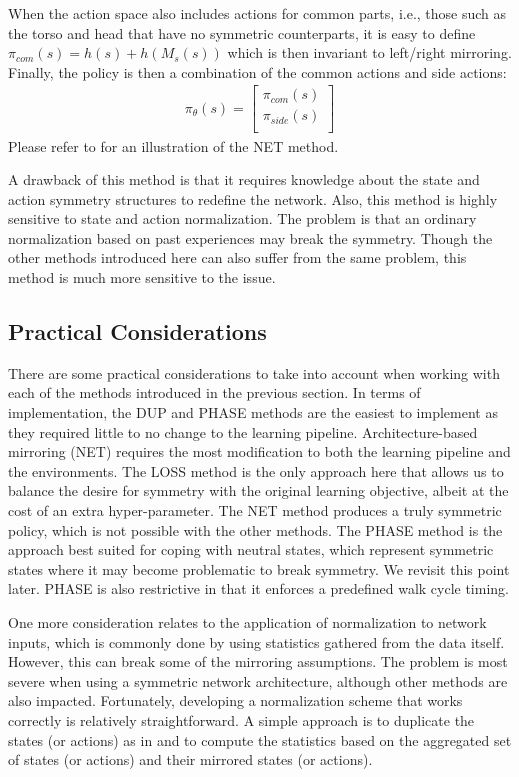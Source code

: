 When the action space also includes actions for common parts,
i.e., those such as the torso and head that have no symmetric counterparts,
it is easy to define $\pi_{com}(s) = h(s) + h(M_s(s))$ 
which is then invariant to left/right mirroring. 
Finally, the policy is then a combination of the common actions and side actions:
\begin{align*}
    \pi_\theta(s) = \begin{bmatrix}
        \pi_{com}(s)\\
        \pi_{side}(s)\\
    \end{bmatrix}
\end{align*}
Please refer to  for an illustration of the NET method.

A drawback of this method is that it requires knowledge about the state and action symmetry structures to redefine the network. 
Also, this method is highly sensitive to state and action normalization.
The problem is that an ordinary normalization based on past experiences may break the symmetry.
Though the other methods introduced here can also suffer from the same problem, this method is much more sensitive to the issue.

\subsection{Practical Considerations}

There are some practical considerations to take into account when working with 
each of the methods introduced in the previous section.
In terms of implementation, the DUP and PHASE methods are the easiest to 
implement as they required little to no change to the learning pipeline.  
Architecture-based mirroring (NET)
requires the most modification to both the learning pipeline and the environments.
The LOSS method is the only approach here that allows us to balance the desire for symmetry 
with the original learning objective, albeit at the cost of an extra hyper-parameter.  
The NET method produces a truly symmetric policy, which is not possible with the other methods.
The PHASE method is the approach best suited for coping with neutral states, 
which represent symmetric states where it may become problematic to break symmetry.
We revisit this point later.
PHASE is also restrictive in that it enforces a predefined walk cycle timing.


One more consideration relates to the application of normalization to network inputs, which is commonly done by 
using statistics gathered from the data itself.  
However, this can break some of the mirroring assumptions.  
The problem is most severe when using a symmetric network architecture, although other methods are
also impacted.
Fortunately, developing a normalization scheme that works correctly is relatively straightforward. 
A simple approach is to duplicate the states (or actions) as in  
and to compute the statistics based on the aggregated set of states (or actions) and 
their mirrored states (or actions).



